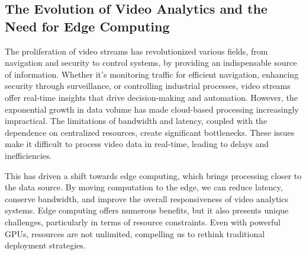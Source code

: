 

\subsection{The Evolution of Video Analytics and the Need for Edge Computing}

The proliferation of video streams has revolutionized various fields, from navigation and security to control systems, by providing an indispensable source of information. Whether it's monitoring traffic for efficient navigation, enhancing security through surveillance, or controlling industrial processes, video streams offer real-time insights that drive decision-making and automation. However, the exponential growth in data volume has made cloud-based processing increasingly impractical. The limitations of bandwidth and latency, coupled with the dependence on centralized resources, create significant bottlenecks. These issues make it difficult to process video data in real-time, leading to delays and inefficiencies.

This has driven a shift towards edge computing, which brings processing closer to the data source. By moving computation to the edge, we can reduce latency, conserve bandwidth, and improve the overall responsiveness of video analytics systems. Edge computing offers numerous benefits, but it also presents unique challenges, particularly in terms of resource constraints. Even with powerful GPUs, resources are not unlimited, compelling us to rethink traditional deployment strategies.

